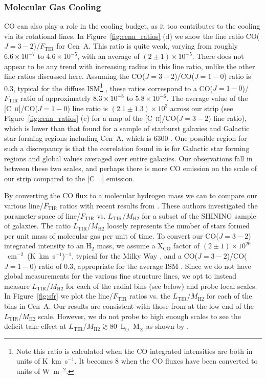 \subsubsection{Molecular Gas Cooling}
CO can also play a role in the cooling budget, as it too contributes to the cooling via its rotational lines.  In Figure~\ref{fig:cena_ratios} (d) we show the line ratio CO($J=3-2$)/$F_{\mathrm{TIR}}$ for Cen~A.  This ratio is quite weak, varying from roughly $6.6 \times 10^{-7}$ to $4.6 \times 10^{-5}$, with an average of $(2 \pm 1) \times 10^{-5}$.  There does not appear to be any trend with increasing radius in this line ratio, unlike the other line ratios discussed here.  Assuming the CO($J=3-2$)/CO($J=1-0$) ratio is 0.3, typical for the diffuse ISM\footnote{Note this ratio is calculated when the CO integrated intensities are both in units of K~km~s$^{-1}$.  It becomes 8 when the CO fluxes have been converted to units of W~m$^{-2}$.} \citep{2009ApJ...693.1736W}, these ratios correspond to a CO($J=1-0$)/$F_{\mathrm{TIR}}$ ratio of approximately $8.3 \times 10^{-8}$ to $5.8 \times 10^{-6}$.  The average value of the [C~\textsc{ii}]/CO($J=1-0$) line ratio is $(2.1 \pm 1.3) \times 10^{3}$ across our strip (see Figure~\ref{fig:cena_ratios} (c) for a map of the [C~\textsc{ii}]/CO($J=3-2$) line ratio), which is lower than that found for a sample of starburst galaxies and Galactic star forming regions including Cen~A, which is 6300 \citep{1991ApJ...373..423S}.  One possible region for such a discrepancy is that the correlation found in \citet{1991ApJ...373..423S} is for Galactic star forming regions and global values averaged over entire galaxies.  Our observations fall in between these two scales, and perhaps there is more CO emission on the scale of our strip compared to the [C~\textsc{ii}] emission.

By converting the CO flux to a molecular hydrogen mass we can to compare our various line/$F_{\mathrm{TIR}}$ ratios with recent results from \citet{2011ApJ...728L...7G}.  These authors investigated the parameter space of line/$F_{\mathrm{TIR}}$ vs. $L_{\mathrm{TIR}}$/$M_{\mathrm{H}2}$ for a subset of the SHINING sample of galaxies.  The ratio $L_{\mathrm{TIR}}$/$M_{\mathrm{H}2}$ loosely represents the number of stars formed per unit mass of molecular gas per unit of time.  To convert our CO($J=3-2$) integrated intensity to an H$_{2}$ mass, we assume a X$_{\mathrm{CO}}$ factor of $(2 \pm 1) \times 10^{20}$~cm$^{-2}$~(K~km~s$^{-1}$)$^{-1}$, typical for the Milky Way \citep{1988A&A...207....1S}, and a CO($J=3-2$)/CO($J=1-0$) ratio of 0.3, appropriate for the average ISM \citep{2009ApJ...693.1736W}.  Since we do not have global measurements for the various fine structure lines, we opt to instead measure $L_{\mathrm{TIR}}$/$M_{\mathrm{H}2}$ for each of the radial bins (see below) and probe local scales.  In Figure~\ref{fig:sfr} we plot the line/$F_{\mathrm{TIR}}$ ratios vs. the $L_{\mathrm{TIR}}$/$M_{\mathrm{H}2}$ for each of the bins in Cen~A.  Our results are consistent with those from \citet{2011ApJ...728L...7G} at the low end of the $L_{\mathrm{TIR}}$/$M_{\mathrm{H}2}$ scale.  However, we do not probe to high enough scales to see the deficit take effect at $L_{\mathrm{TIR}}$/$M_{\mathrm{H}2} \gtrsim 80$~L$_{\odot}$~M$_{\odot}$ as shown by \citet{2011ApJ...728L...7G}. 

